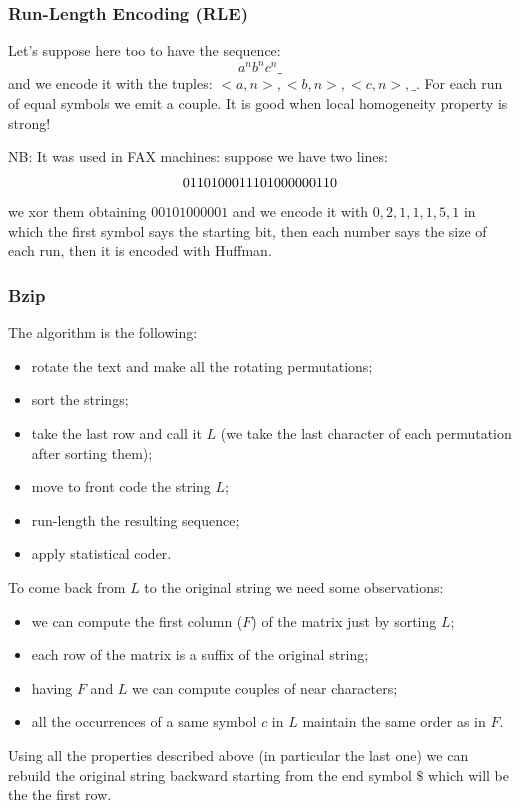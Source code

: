 \subsubsection{Run-Length Encoding (RLE)}
Let's suppose here too to have the sequence:
$$
    a^n b^n c^n \_
$$
and we encode it with the tuples: $<a, n>, <b, n>, <c, n>, \_$.
For each run of equal symbols we emit a couple.
It is good when local homogeneity property is strong!

NB: It was used in FAX machines: suppose we have two lines:
$$
    01101000111 \\
    01000000110
$$
we xor them obtaining $00101000001$ and we encode it with $0, 2, 1, 1, 1, 5, 1$ in which the first symbol says the starting bit, then each number says the size of each run, then it is encoded with Huffman.

\subsubsection{Bzip}
The algorithm is the following:
\begin{itemize}
    \item rotate the text and make all the rotating permutations;
    \item sort the strings;
    \item take the last row and call it $L$ (we take the last character of each permutation after sorting them);
    \item move to front code the string $L$;
    \item run-length the resulting sequence;
    \item apply statistical coder.
\end{itemize}

To come back from $L$ to the original string we need some observations:
\begin{itemize}
    \item we can compute the first column ($F$) of the matrix just by sorting $L$;
    \item each row of the matrix is a suffix of the original string;
    \item having $F$ and $L$ we can compute couples of near characters;
    \item all the occurrences of a same symbol $c$ in $L$ maintain the same order as in $F$.
\end{itemize}
Using all the properties described above (in particular the last one) we can rebuild the original string backward starting from the end symbol $\$$ which will be the the first row.

